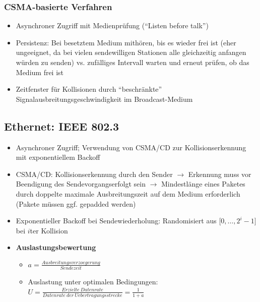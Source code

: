 \subsubsection{CSMA-basierte Verfahren}
\begin{itemize}
	\item Asynchroner Zugriff mit Medienprüfung ("`Listen before talk"')
	\item Persistenz: Bei besetztem Medium mithören, bis es wieder frei ist (eher ungeeignet, da bei vielen sendewilligen Stationen alle gleichzeitig anfangen würden zu senden) vs. zufälliges Intervall warten und erneut prüfen, ob das Medium frei ist
	\item Zeitfenster für Kollisionen durch "`beschränkte"' Signalausbreitungsgeschwindigkeit im Broadcast-Medium
\end{itemize}


\subsection{Ethernet: IEEE 802.3}
\begin{itemize}
	\item Asynchroner Zugriff; Verwendung von CSMA/CD zur Kollisionserkennung mit exponentiellem Backoff
	\item CSMA/CD: Kollisionserkennung durch den Sender \(\rightarrow\) Erkennung muss vor Beendigung des Sendevorgangserfolgt sein \(\rightarrow\) Mindestlänge eines Paketes durch doppelte maximale Ausbreitungszeit auf dem Medium erforderlich (Pakete müssen ggf. gepadded werden)
	\item Exponentieller Backoff bei Sendewiederholung: Randomisiert aus \(\big\lbrack0,\dots,2^i-1\big\rbrack\) bei \(i\)ter Kollision
	\item \textbf{Auslastungsbewertung}
	\begin{itemize}
		\item \(a=\frac{Ausbreitungsverzoegerung}{Sendezeit}\)
		\item Auslastung unter optimalen Bedingungen: \(U=\frac{Erzielte~Datenrate}{Datenrate~der~Uebertragungsstrecke}=\frac{1}{1+a}\)
	\end{itemize}
\end{itemize}

